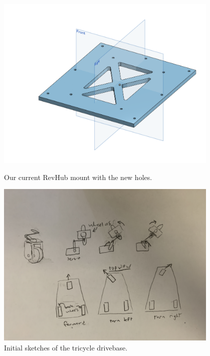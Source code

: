 \begin{figure}[ht]
\centering
\begin{minipage}[b]{.48\textwidth}
  \centering
  \includegraphics[width=0.95\textwidth]{Meetings/October/10-07-21/10-7-21_Hardware_Figure1 - Nathan Forrer.PNG}
  \caption{Our current RevHub mount with the new holes.}
  \label{fig:100721_1}
\end{minipage}%
\hfill%
\begin{minipage}[b]{.48\textwidth}
  \centering
  \includegraphics[width=0.95\textwidth]{Meetings/October/10-07-21/10-7-21_Hardware_Figure2 - Nathan Forrer.JPG}
  \caption{Initial sketches of the tricycle drivebase.}
  \label{fig:100721_2}
\end{minipage}
\end{figure}

